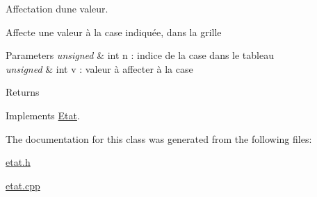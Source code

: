 Affectation d\textquotesingle{}une valeur. 

Affecte une valeur à la case indiquée, dans la grille


\begin{DoxyParams}{Parameters}
{\em unsigned} & int n \+: indice de la case dans le tableau \\
\hline
{\em unsigned} & int v \+: valeur à affecter à la case \\
\hline
\end{DoxyParams}
\begin{DoxyReturn}{Returns}

\end{DoxyReturn}


Implements \mbox{\hyperlink{class_etat_a92ad894e65a419e1cddb335664deea3e}{Etat}}.



The documentation for this class was generated from the following files\+:\begin{DoxyCompactItemize}
\item 
\mbox{\hyperlink{etat_8h}{etat.\+h}}\item 
\mbox{\hyperlink{etat_8cpp}{etat.\+cpp}}\end{DoxyCompactItemize}
